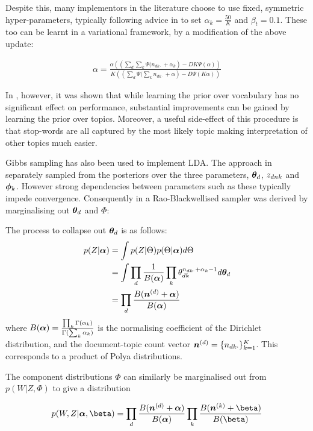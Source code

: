 Despite this, many implementors in the literature choose to use fixed, symmetric hyper-parameters, typically following advice in \cite{Griffiths2004} to set $\alpha_k = \frac{50}{K}$ and $\beta_t=0.1$. These too can be learnt in a variational framework, by a modification of the above update\cite{Heinrich2005}:

\begin{align}
\alpha = \frac{\alpha \left( \left(\sum_d \sum_k \Psi(n_{dk\cdot} + \alpha_k \right) - DK \Psi (\alpha)\right)}{K \left( \left(\sum_d  \Psi(\sum_k n_{dk\cdot} + \alpha \right) - D \Psi (K \alpha)\right)}
\end{align}

In \cite{Wallach2009a}, however, it was shown that while learning the prior over vocabulary has no significant effect on performance, substantial improvements can be gained by learning the prior over topics. Moreover, a useful side-effect of this procedure is that stop-words are all captured by the most likely topic making interpretation of other topics much easier.

Gibbs sampling has also been used to implement LDA. The approach in  \cite{Pritchard2000} separately sampled from the posteriors over the three parameters, ${ \bm \theta_d }$, ${ z_{dnk} }$ and ${ \bm \phi_k }$. However strong dependencies between parameters such as these typically impede convergence\cite{CasellaRobert1999}. Consequently in \cite{Griffiths2004} a Rao-Blackwellised sampler was derived by marginalising out ${ \bm \theta_d }$ and $\Phi$:

The process to collapse out ${ \bm \theta_d }$ is as follows:
\begin{align}
p(Z|\bm \alpha) & = \int p(Z|\Theta)p(\Theta|\bm \alpha) d\Theta \\
& = \int \prod_d \frac{1}{ {B(\bm \alpha)} } \prod_k \theta_{dk}^{n_{dk\cdot} + \alpha_k - 1} d{ \bm \theta_d } \\
& = \prod_d \frac{B(\bm n^{(d)} + \bm \alpha)}{B(\bm \alpha)}
\end{align}
where $B(\bm \alpha) = \frac{\prod_k \Gamma(\alpha_k)}{\Gamma(\sum_k \alpha_k)}$ is the normalising coefficient of the Dirichlet distribution, and the document-topic count vector $\bm n^{(d)} = \{ n_{dk\cdot} \}_{k=1}^K$. This corresponds to a product of Polya distributions.

The component distributions $\Phi$ can similarly be marginalised out from $p(W|Z,
\Phi)$ to give a distribution

\begin{align}
p(W,Z|\vv{\alpha},\vv{\beta}) = \prod_d \frac{B(\vv{n}^{(d)} + \vv{\alpha})}{B(\vv{\alpha})} \prod_k \frac{B(\vv{n}^{(k)} + \vv{\beta})}{B(\vv{\beta})}
\end{align}

